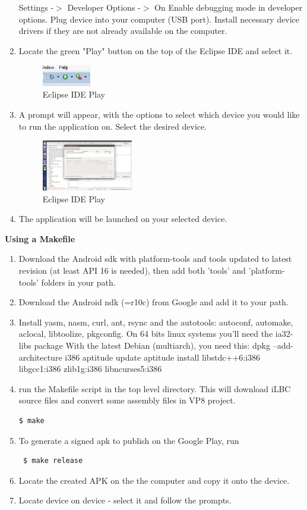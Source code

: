 \documentclass[11pt]{article}
\begin{document}
\begin{enumerate}
\subitem Settings -$>$ Developer Options -$>$ On
\subitem Enable debugging mode in developer options.
\subitem Plug device into your computer (USB port).
\subitem Install necessary device drivers if they are not already available on the computer.
\item Locate the green "Play" button on the top of the Eclipse IDE and select it.
\begin{figure}[H]
\includegraphics[width=80px]{./images/eclipsePlay.png}
\caption{Eclipse IDE Play}
\label{repoClone}
\end{figure}
\item A prompt will appear, with the options to select which device you would like to run the application on. Select the desired device.
\begin{figure}[H]
\includegraphics[width=150px]{./images/ChooseDeviceScreenShot.png}
\caption{Eclipse IDE Play}
\label{repoClone}
\end{figure}
\item The application will be launched on your selected device.
\end{enumerate}

\textbf{Using a Makefile}
\begin{enumerate}
\item Download the Android sdk with platform-tools and tools updated to latest revision (at least API 16 is needed), then add both 'tools' and 'platform-tools' folders in your path.
\item Download the Android ndk (=r10c) from Google and add it to your path.
\item Install yasm, nasm, curl, ant, rsync and the autotools: autoconf, automake, aclocal, libtoolize, pkgconfig.
\subitem On 64 bits linux systems you'll need the ia32-libs package
\subitem With the latest Debian (multiarch), you need this:
\subsubitem dpkg --add-architecture i386
\subsubitem aptitude update
\subsubitem aptitude install libstdc++6:i386 libgcc1:i386 zlib1g:i386 libncurses5:i386
\item run the Makefile script in the top level directory. This will download iLBC source files and convert some assembly files in VP8 project.
\begin{verbatim}$ make \end{verbatim}
\item To generate a signed apk to publish on the Google Play, run  \begin{verbatim} $ make release \end{verbatim}
\item Locate the created APK on the the computer and copy it onto the device. 
\item Locate device on device - select it and follow the prompts.
\end{enumerate}
\end{document}
